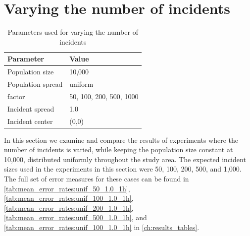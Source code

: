%
%
\section{Varying the number of incidents}
\label{sec:results:unif_NCases_1h}

\begin{table}[htbp]
\centering
\begin{tabular}{ll}
\hline
Parameter & Value \\
\hline
Population size & 10,000 \\
Population \gls{spread} & uniform \\
\Gls{factor} & 50, 100, 200, 500, 1000 \\
Incident \gls{spread} & 1.0 \\
Incident center & (0,0) \\
\hline
\end{tabular}
\caption{Parameters used for varying the number of incidents}
\label{tab:params:unif_NCases_1h}
\end{table}

In this section we examine and compare the results of experiments where the number of incidents is varied, while keeping the population size constant at 10,000, distributed uniformly throughout the study area.
The expected incident sizes used in the experiments in this section were 50, 100, 200, 500, and 1,000.
The full set of error measures for these cases can be found in \autoref{tab:mean_error_rates:unif_50_1.0_1h}, \autoref{tab:mean_error_rates:unif_100_1.0_1h}, \autoref{tab:mean_error_rates:unif_200_1.0_1h}, \autoref{tab:mean_error_rates:unif_500_1.0_1h}, and \autoref{tab:mean_error_rates:unif_100_1.0_1h} in \autoref{ch:results_tables}.


